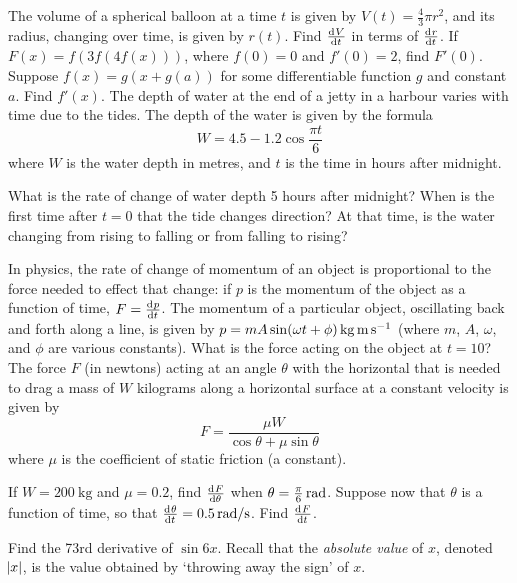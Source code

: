 \begin{questions}
  \question The volume of a spherical balloon at a time $ t $ is given by $ V(t) = \frac{4}{3} \pi r^2 $, and its radius, changing
            over time, is given by $ r(t) $. Find $ \od{V}{t} $ in terms of $ \od{r}{t} $.
  \questioM If $ F(x) = f(3f(4f(x))) $, where $ f(0) = 0 $ and $ f'(0) = 2 $, find $ F'(0) $.
  \questioA Suppose $ f(x) = g(x + g(a)) $ for some differentiable function $ g $ and constant $ a $. Find $ f'(x) $.
  \question The depth of water at the end of a jetty in a harbour varies with time due to the tides. The depth
            of the water is given by the formula
            \begin{displaymath}
              W = 4.5 - 1.2 \cos \frac{\pi t}{6}
            \end{displaymath}
            where $ W $ is the water depth in metres, and $ t $ is the time in hours after midnight.
    \begin{parts}
      \parA What is the rate of change of water depth 5 hours after midnight?
      \parM When is the first time after $ t = 0 $ that the tide changes direction?
      \parE At that time, is the water changing from rising to falling or from falling to rising?
    \end{parts}
  \questioM In physics, the rate of change of momentum of an object is proportional to the force needed to effect
            that change: if $ p $ is the momentum of the object as a function of time, $ F = \od{p}{t} $. The momentum
            of a particular object, oscillating back and forth along a line, is given by $ p = mA\sin(\omega t + \phi)\thinspace\si{\kilo\gram\metre\per\second} $
            (where $ m $, $ A $, $ \omega $, and $ \phi $ are various constants). What is the force acting on the object at $ t = 10 $?
  \question The force $ F $ (in newtons) acting at an angle $ \theta $ with the horizontal that is needed
            to drag a mass of $ W $ kilograms along a horizontal surface at a constant velocity is given by
            \begin{displaymath}
              F = \frac{\mu W}{\cos \theta + \mu \sin \theta}
            \end{displaymath}
            where $ \mu $ is the coefficient of static friction (a constant).
    \begin{parts}
      \parA If $ W = \SI{200}{\kilo\gram} $ and $ \mu = 0.2 $, find $ \od{F}{\theta} $ when $ \theta = \frac{\pi}{6}\thinspace\si{\radian} $.
      \parM Suppose now that $ \theta $ is a function of time, so that $ \od{\theta}{t} = \SI{0.5}{\radian / \second} $. Find $ \od{F}{t} $.
    \end{parts}
  \questioE Find the 73rd derivative of $ \sin 6x $.
  \questioE Recall that the \emph{absolute value} of $ x $, denoted $ \abs{x} $, is the value obtained by `throwing away the sign' of $ x $.
    \begin{parts}

\end{parts}
\end{questions}
